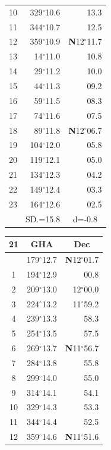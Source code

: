 \documentclass[10pt, a4paper]{report}
\begin{document}
\begin{scriptsize}
\begin{tabular*}{0.2\textwidth}[t]{@{\extracolsep{\fill}}|c|rr|}
10 & 329$^\circ$10.6 & 13.3\\
11 & 344$^\circ$10.7 & 12.5\\[2Pt]
12 & 359$^\circ$10.9 & \textbf{N}12$^\circ$11.7\\
13 & 14$^\circ$11.0 & 10.8\\
14 & 29$^\circ$11.2 & 10.0\\
15 & 44$^\circ$11.3 & \raisebox{0.24ex}{\boldmath$\cdot$~\boldmath$\cdot$~~}09.2\\
16 & 59$^\circ$11.5 & 08.3\\
17 & 74$^\circ$11.6 & 07.5\\[2Pt]
18 & 89$^\circ$11.8 & \textbf{N}12$^\circ$06.7\\
19 & 104$^\circ$12.0 & 05.8\\
20 & 119$^\circ$12.1 & 05.0\\
21 & 134$^\circ$12.3 & \raisebox{0.24ex}{\boldmath$\cdot$~\boldmath$\cdot$~~}04.2\\
22 & 149$^\circ$12.4 & 03.3\\
23 & 164$^\circ$12.6 & 02.5\\
\hline
\rule{0pt}{2.4ex} & \multicolumn{1}{c}{SD.=15.8} & \multicolumn{1}{c|}{d=-0.8}\\
\hline
\end{tabular*}\noindent
\begin{tabular*}{0.2\textwidth}[t]{@{\extracolsep{\fill}}|c|rr|}
\hline
\multicolumn{1}{|c|}{\rule{0pt}{2.6ex}\textbf{21}} & \multicolumn{1}{c}{\textbf{GHA}} & \multicolumn{1}{c|}{\textbf{Dec}}\\
\hline\rule{0pt}{2.6ex}\noindent
0 & 179$^\circ$12.7 & \textbf{N}12$^\circ$01.7\\
1 & 194$^\circ$12.9 & 00.8\\
2 & 209$^\circ$13.0 & 12$^\circ$00.0\\
3 & 224$^\circ$13.2 & 11$^\circ$59.2\\
4 & 239$^\circ$13.3 & 58.3\\
5 & 254$^\circ$13.5 & 57.5\\[2Pt]
6 & 269$^\circ$13.7 & \textbf{N}11$^\circ$56.7\\
7 & 284$^\circ$13.8 & 55.8\\
8 & 299$^\circ$14.0 & 55.0\\
9 & 314$^\circ$14.1 & \raisebox{0.24ex}{\boldmath$\cdot$~\boldmath$\cdot$~~}54.1\\
10 & 329$^\circ$14.3 & 53.3\\
11 & 344$^\circ$14.4 & 52.5\\[2Pt]
12 & 359$^\circ$14.6 & \textbf{N}11$^\circ$51.6\\

\end{tabular*}
\end{scriptsize}
\end{document}

